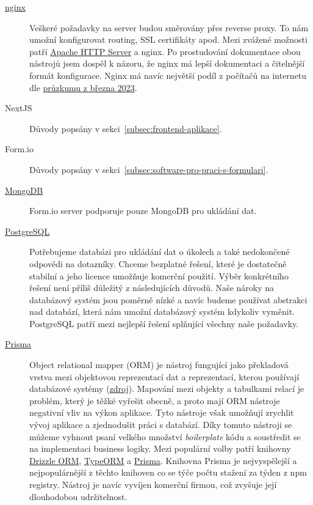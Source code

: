 \begin{description}
    \item[\href{https://nginx.org/}{nginx}]
    Veškeré požadavky na server budou směrovány přes reverse proxy.
    To nám umožní konfigurovat routing, SSL certifikáty apod.
    Mezi zvážené možnosti patří \href{https://httpd.apache.org/}{Apache HTTP Server} a nginx.
    Po prostudování dokumentace obou nástrojů jsem dospěl k názoru, že nginx má lepší dokumentaci a čitelnější formát konfigurace.
    Nginx má navíc největší podíl z počítačů na internetu dle \href{https://news.netcraft.com/archives/category/web-server-survey/}{průzkumu z března 2023}.
    \item[NextJS]
    Důvody popsány v sekci~\ref{subsec:frontend-aplikace}.
    \item[Form.io]
    Důvody popsány v sekci~\ref{subsec:software-pro-praci-s-formulari}.
    \item[\href{https://www.mongodb.com/}{MongoDB}]
    Form.io server podporuje pouze MongoDB pro ukládání dat\@.
    \item[\href{https://www.postgresql.org/}{PostgreSQL}]
    Potřebujeme databázi pro ukládání dat o úkolech a také nedokončené odpovědi na dotazníky.
    Chceme bezplatné řešení, které je dostatečně stabilní a jeho licence umožňuje komerční použití.
    Výběr konkrétního řešení není příliš důležitý z následujících důvodů.
    Naše nároky na databázový systém jsou poměrně nízké a navíc budeme používat abstrakci nad databází, která nám umožní databázový systém kdykoliv vyměnit.
    PostgreSQL patří mezi nejlepší řešení splňující všechny naše požadavky.
    \item[\href{https://www.prisma.io/}{Prisma}]
    Object relational mapper (ORM) je nástroj fungující jako překladová vrstva mezi objektovou reprezentací dat a reprezentací, kterou používají databázové systémy (\href{https://www.prisma.io/dataguide/types/relational/what-is-an-orm#what-is-an-orm}{zdroj}).
    Mapování mezi objekty a tabulkami relací je problém, který je těžké vyřešit obecně, a proto mají ORM nástroje negativní vliv na výkon aplikace.
    Tyto nástroje však umožňují zrychlit vývoj aplikace a zjednodušit práci s databází.
    Díky tomuto nástroji se můžeme vyhnout psaní velkého množství \textit{boilerplate} kódu a soustředit se na implementaci business logiky.
    Mezi populární volby patří knihovny \href{https://github.com/drizzle-team/drizzle-orm}{Drizzle ORM}, \href{https://github.com/typeorm/typeorm}{TypeORM} a \href{https://github.com/prisma/prisma}{Prisma}.
    Knihovna Prisma je nejvyspělejší a nejpopulárnější z těchto knihoven co se týče počtu stažení za týden z npm registry.
    Nástroj je navíc vyvíjen komerční firmou, což zvyšuje její dlouhodobou udržitelnost.
\end{description}

